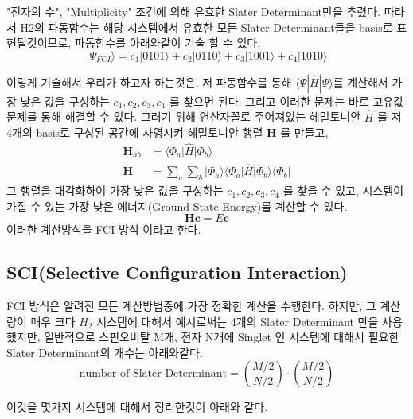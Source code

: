 \documentclass[10pt]{article}
\begin{document}
"전자의 수", "Multiplicity" 조건에 의해 유효한 Slater Determinant만을 추렸다. 따라서 H2의 파동함수는 해당 시스템에서 유효한 모든 Slater Determinant들을 basis로 표현될것이므로, 
파동함수를 아래와같이 기술 할 수 있다. 
\[
|\Psi_{FCI} \rangle = c_1|0101\rangle + c_2|0110\rangle + c_3|1001\rangle+ c_4|1010\rangle
\]

이렇게 기술해서 우리가 하고자 하는것은, 저 파동함수를 통해 \(\langle \Psi|\hat{H}|\Psi \rangle\)를 계산해서 가장 낮은 값을 구성하는 \(c_1, c_2, c_3, c_4 \) 를 찾으면 된다.
그리고 이러한 문제는 바로 고유값 문제를 통해 해결할 수 있다. 
그러기 위해 연산자꼴로 주어져있는 헤밀토니안 \(\hat{H}\) 를 저 4개의 basis로 구성된 공간에 사영시켜 헤밀토니안 행렬 \(\mathbf{H}\) 를 만들고, 
\begin{align*}
\mathbf{H}_{ab} &= \langle \Phi_a \vert \hat{H} \vert \Phi_b \rangle \\
\mathbf{H} &= \sum_a \sum_b \vert \Phi_a \rangle \langle \Phi_a \vert \hat{H} \vert \Phi_b \rangle \langle \Phi_b \vert
\end{align*}
그 행렬을 대각화하여 가장 낮은 값을 구성하는 \(c_1, c_2, c_3, c_4 \) 를 찾을 수 있고, 시스템이 가질 수 있는 가장 낮은 에너지(Ground-State Energy)를 계산할 수 있다. 
\[
\mathbf{H}\mathbf{c} = E\mathbf{c}
\]
이러한 계산방식을 FCI 방식 이라고 한다. 

\subsection{SCI(Selective Configuration Interaction)}
FCI 방식은 알려진 모든 계산방법중에 가장 정확한 계산을 수행한다. 하지만, 그 계산량이 매우 크다 \(H_2\) 시스템에 대해서 예시로써는 4개의 Slater Determinant 만을 사용했지만, 
일반적으로 스핀오비탈 M개, 전자 N개에 Singlet 인 시스템에 대해서 필요한 Slater Determinant의 개수는 아래와같다. 
\[
\text{number of Slater Determinant} = \binom{M/2}{N/2}\cdot\binom{M/2}{N/2}
\]

이것을 몇가지 시스템에 대해서 정리한것이 아래와 같다. 
\end{document}
